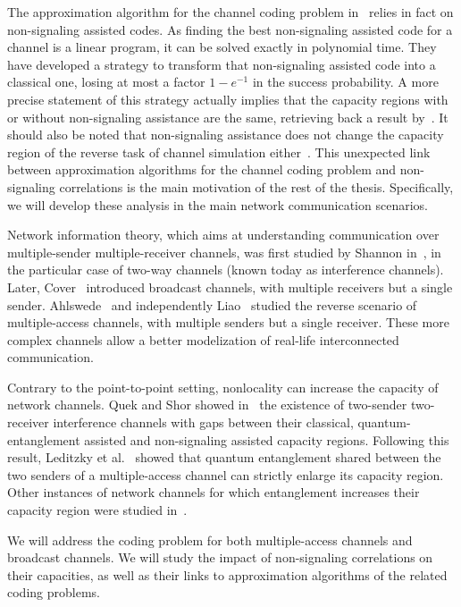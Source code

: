 The approximation algorithm for the channel coding problem in~\cite{BF18} relies in fact on non-signaling assisted codes. As finding the best non-signaling assisted code for a channel is a linear program, it can be solved exactly in polynomial time. They have developed a strategy to transform that non-signaling assisted code into a classical one, losing at most a factor $1-e^{-1}$ in the success probability. A more precise statement of this strategy actually implies that the capacity regions with or without non-signaling assistance are the same, retrieving back a result by~\cite{Matthews12}. It should also be noted that non-signaling assistance does not change the capacity region of the reverse task of channel simulation either~\cite{CRBT22}. This unexpected link between approximation algorithms for the channel coding problem and non-signaling correlations is the main motivation of the rest of the thesis. Specifically, we will develop these analysis in the main network communication scenarios.

Network information theory, which aims at understanding communication over multiple-sender multiple-receiver channels, was first studied by Shannon in~\cite{Shannon61}, in the particular case of two-way channels (known today as interference channels). Later, Cover~\cite{Cover72} introduced broadcast channels, with multiple receivers but a single sender. Ahlswede~\cite{Ahlswede73} and independently Liao~\cite{Liao73} studied the reverse scenario of multiple-access channels, with multiple senders but a single receiver. These more complex channels allow a better modelization of real-life interconnected communication.

Contrary to the point-to-point setting, nonlocality can increase the capacity of network channels. Quek and Shor showed in~\cite{QS17} the existence of two-sender two-receiver interference channels with gaps between their classical, quantum-entanglement assisted and non-signaling assisted capacity regions. Following this result, Leditzky et al.~\cite{LALS20,SLSS22} showed that quantum entanglement shared between the two senders of a multiple-access channel can strictly enlarge its capacity region. Other instances of network channels for which entanglement increases their capacity region were studied in~\cite{Noetzel20,ND20}.

We will address the coding problem for both multiple-access channels and broadcast channels. We will study the impact of non-signaling correlations on their capacities, as well as their links to approximation algorithms of the related coding problems.

